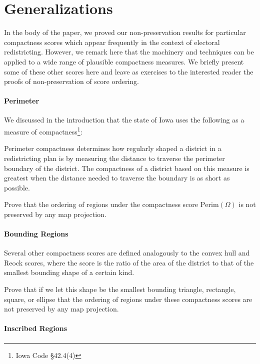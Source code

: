 \section{Generalizations}
\label{sec:generalz}
In the body of the paper, we proved our non-preservation results for particular compactness scores which appear frequently in the context of electoral redistricting.  However, we remark here that the machinery and techniques can be applied to a wide range of plausible compactness measures.  We briefly present some of these other scores here and leave as exercises to the interested reader the proofs of non-preservation of score ordering.

\paragraph{Perimeter} 

We discussed in the introduction that the state of Iowa uses the following as a measure of compactness\footnote{Iowa Code \S42.4(4)}:

\begin{displayquote}
	
	Perimeter compactness determines how regularly shaped a district in a
	redistricting plan is by measuring the distance to traverse the perimeter boundary of
	the district. The compactness of a district based on this measure is greatest when
	the distance needed to traverse the boundary is as short as possible. 
	
	\end{displayquote}

Prove that the ordering of regions  under the compactness score $\mathrm{Perim}(\Omega)$ is not preserved by any map projection.




\paragraph{Bounding Regions}

Several other compactness scores are defined analogously to the convex hull and Reock scores, where the score is the ratio of the area of the district to that of the smallest bounding shape of a certain kind.

Prove that if we let this shape be the smallest bounding triangle, rectangle, square, or ellipse that the ordering of regions under these compactness scores are not preserved by any map projection.

\paragraph{Inscribed Regions}

